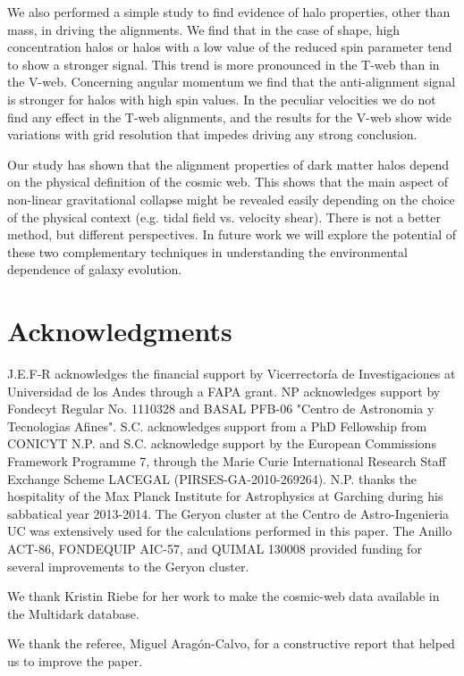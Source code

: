 \documentclass[useAMS,usenatbib]{mn2e}
\begin{document}
We also performed a simple study to find evidence of halo properties,
other than mass, in driving the alignments. We find that in the case of
shape, high concentration halos or halos with a low value of
the reduced spin parameter tend to show a stronger signal. This trend is
more pronounced in the T-web than in the V-web. Concerning angular
momentum we find that the anti-alignment signal is stronger for halos
with high spin values. In the peculiar velocities we do not find any
effect in the T-web alignments, and the results for the V-web show 
wide variations with grid resolution that impedes driving any strong
conclusion.

Our study has shown that the alignment properties of dark matter
halos depend on the physical definition of the cosmic web. This shows
that the main aspect of non-linear gravitational collapse might be
revealed easily depending on the choice of the physical context
(e.g. tidal field vs. velocity shear). There is not a better method,
but different perspectives. In future work we will explore the
potential of these two complementary techniques in understanding the
environmental dependence of galaxy evolution.

\section*{Acknowledgments}

J.E.F-R acknowledges the financial support by Vicerrector\'ia de
Investigaciones at Universidad de los Andes through a FAPA grant.
NP acknowledges support by Fondecyt Regular No. 1110328 and BASAL PFB-06 "Centro de Astronomia y Tecnologias Afines".
S.C. acknowledges support from a PhD Fellowship from CONICYT
N.P. and S.C. acknowledge support by the European Commissions Framework
Programme 7, through the Marie Curie International Research Staff
Exchange Scheme LACEGAL (PIRSES-GA-2010-269264). N.P. thanks the
hospitality of the Max Planck Institute for Astrophysics at Garching
during his sabbatical year 2013-2014. The Geryon cluster at the Centro de Astro-Ingenieria UC was extensively used for the calculations performed in this paper.
The Anillo ACT-86, FONDEQUIP AIC-57, and QUIMAL 130008 provided
funding for several improvements to the Geryon cluster.


We thank Kristin Riebe for her work to make the cosmic-web data available in the Multidark database. 

We thank the referee, Miguel Arag\'on-Calvo, for a constructive report
that helped us to improve the paper.  
\end{document}
